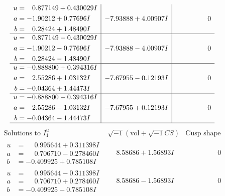 \documentclass[1p]{elsarticle_modified}
\theoremstyle{definition}
\newcommand{\I}{\sqrt{-1}}
\begin{document}
$$\begin{array}{c|c|c}
\begin{aligned}
u &= \phantom{-}0.877149 + 0.430029 I \\
a &= -1.90212 + 0.77696 I \\
b &= \phantom{-}0.28424 + 1.48490 I\end{aligned}
 & -7.93888 + 4.00907 I & \phantom{-0.000000 } 0 \\ \hline\begin{aligned}
u &= \phantom{-}0.877149 - 0.430029 I \\
a &= -1.90212 - 0.77696 I \\
b &= \phantom{-}0.28424 - 1.48490 I\end{aligned}
 & -7.93888 - 4.00907 I & \phantom{-0.000000 } 0 \\ \hline\begin{aligned}
u &= -0.888800 + 0.394316 I \\
a &= \phantom{-}2.55286 + 1.03132 I \\
b &= -0.04364 + 1.44473 I\end{aligned}
 & -7.67955 - 0.12193 I & \phantom{-0.000000 } 0 \\ \hline\begin{aligned}
u &= -0.888800 - 0.394316 I \\
a &= \phantom{-}2.55286 - 1.03132 I \\
b &= -0.04364 - 1.44473 I\end{aligned}
 & -7.67955 + 0.12193 I & \phantom{-0.000000 } 0\\
 \hline 
 \end{array}$$\newpage$$\begin{array}{c|c|c}  
\text{Solutions to }I^u_{1}& \I (\text{vol} + \sqrt{-1}CS) & \text{Cusp shape}\\
 \hline 
\begin{aligned}
u &= \phantom{-}0.995644 + 0.311398 I \\
a &= \phantom{-}0.706710 - 0.278460 I \\
b &= -0.409925 + 0.785108 I\end{aligned}
 & \phantom{-}8.58686 + 1.56893 I & \phantom{-0.000000 } 0 \\ \hline\begin{aligned}
u &= \phantom{-}0.995644 - 0.311398 I \\
a &= \phantom{-}0.706710 + 0.278460 I \\
b &= -0.409925 - 0.785108 I\end{aligned}
 & \phantom{-}8.58686 - 1.56893 I & \phantom{-0.000000 } 0 \\ \hline\begin{aligned}

\end{aligned}
\end{array}$$
\end{document}
